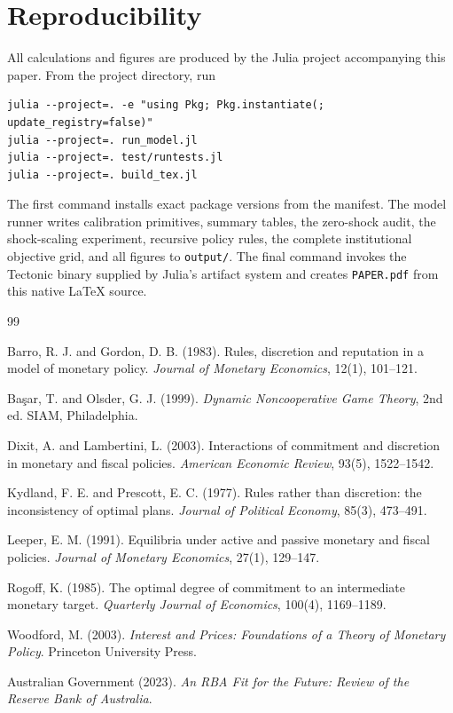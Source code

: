 \documentclass[11pt]{article}
\begin{document}
\appendix
\section{Reproducibility}

All calculations and figures are produced by the Julia project accompanying
this paper.  From the project directory, run
\begin{verbatim}
julia --project=. -e "using Pkg; Pkg.instantiate(; update_registry=false)"
julia --project=. run_model.jl
julia --project=. test/runtests.jl
julia --project=. build_tex.jl
\end{verbatim}
The first command installs exact package versions from the manifest.  The model
runner writes calibration primitives, summary tables, the zero-shock audit,
the shock-scaling experiment, recursive policy rules, the complete institutional
objective grid, and all figures to \texttt{output/}.  The final command invokes
the Tectonic binary supplied by Julia's artifact system and creates
\texttt{PAPER.pdf} from this native \LaTeX{} source.

\begin{thebibliography}{99}

Barro, R. J. and Gordon, D. B. (1983).
Rules, discretion and reputation in a model of monetary policy.
\emph{Journal of Monetary Economics}, 12(1), 101--121.

Ba\c{s}ar, T. and Olsder, G. J. (1999).
\emph{Dynamic Noncooperative Game Theory}, 2nd ed.
SIAM, Philadelphia.

Dixit, A. and Lambertini, L. (2003).
Interactions of commitment and discretion in monetary and fiscal policies.
\emph{American Economic Review}, 93(5), 1522--1542.

Kydland, F. E. and Prescott, E. C. (1977).
Rules rather than discretion: the inconsistency of optimal plans.
\emph{Journal of Political Economy}, 85(3), 473--491.

Leeper, E. M. (1991).
Equilibria under active and passive monetary and fiscal policies.
\emph{Journal of Monetary Economics}, 27(1), 129--147.

Rogoff, K. (1985).
The optimal degree of commitment to an intermediate monetary target.
\emph{Quarterly Journal of Economics}, 100(4), 1169--1189.

Woodford, M. (2003).
\emph{Interest and Prices: Foundations of a Theory of Monetary Policy}.
Princeton University Press.

Australian Government (2023).
\emph{An RBA Fit for the Future: Review of the Reserve Bank of Australia}.

\end{thebibliography}
\end{document}
